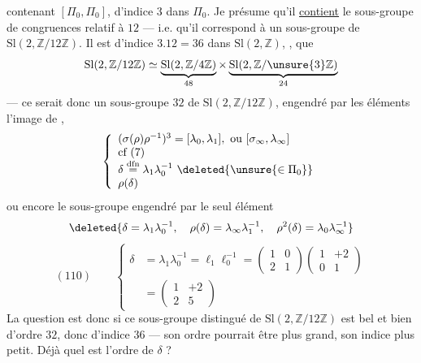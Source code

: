 contenant $[\Pi_0,\Pi_0]$, d'indice $3$ dans $\Pi_0$.
Je présume qu'il  \uline{contient} le sous-groupe de
congruences relatif à $12$ --- i.e. qu'il correspond à un sous-groupe
 de $\mathrm{Sl}(2,\mathbb Z/12\mathbb Z)$.
Il est d'indice $3.12=36$ dans $\mathrm{Sl}(2,\mathbb Z)$,
,
 que
\[
\mathrm{Sl}(2,\mathbb Z/12\mathbb Z)\simeq
\underbrace{\mathrm{Sl}(2,\mathbb Z/4\mathbb Z)}_{48}\times
\underbrace{\mathrm{Sl}(2,\mathbb Z/\unsure{3}\mathbb Z)}_{24}
\]
--- ce serait donc un sous-groupe \uline{}
$32$ de $\mathrm{Sl}(2,\mathbb Z/12\mathbb Z)$,
engendré par les éléments  l'image de
\deleted{$[\sigma_\infty,\lambda_\infty]$},
\[
\left\{
\begin{array}{l}
(\sigma(\rho)\rho^{-1})^3=[\lambda_0,\lambda_1],\ \text{ou }[\sigma_\infty,\lambda_\infty]\\
\text{cf (7)}\\
\delta\overset{\mathrm{dfn}}{=}\lambda_1\lambda_0^{-1}
\ \deleted{\unsure{\in\Pi_0}}\\
\rho(\delta)
\end{array}
\right.
\]
ou encore le sous-groupe  engendré par le seul élément
\[
\deleted{\delta=\lambda_1\lambda_0^{-1},\quad
\rho(\delta)=\lambda_\infty\lambda_1^{-1},\quad
\rho^2(\delta)=\lambda_0\lambda_\infty^{-1}}
\]
\[
(110)\qquad
\left\{
\begin{aligned}
\delta&=\lambda_1\lambda_0^{-1}=\ell_1\ell_0^{-1}
=\begin{pmatrix}1&0\\2&1\end{pmatrix}
 \begin{pmatrix}1&+2\\0&1\end{pmatrix}\\
&=\begin{pmatrix}1&+2\\2&5\end{pmatrix}
\end{aligned}
\right.
\]
La question est donc si ce sous-groupe distingué de
$\mathrm{Sl}(2,\mathbb Z/12\mathbb Z)$ est bel et bien d'ordre $32$,
donc d'indice $36$ --- son ordre pourrait être plus grand, son indice
plus petit. Déjà quel est l'ordre de $\delta$ ?


